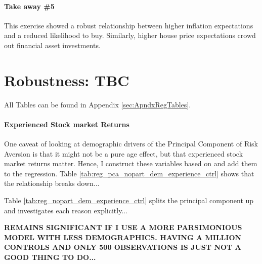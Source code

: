 \documentclass[ProjectABM]{subfiles}
\begin{document}




\paragraph{Take away \#5}
This exercise showed a robust relationship between higher inflation expectations and a reduced likelihood to buy. Similarly, higher house price expectations crowd out financial asset investments.

\section{Robustness: TBC}\label{sec:robustness}
All Tables can be found in Appendix \ref{sec:ApndxRegTables}.

\paragraph{Experienced Stock market Returns}
One caveat of looking at demographic drivers of the Principal Component of Risk Aversion is that it might not be a pure age effect, but that experienced stock market returns matter. Hence, I construct these variables based on \cite{malmendier_2011} and add them to the regression.
Table \ref{tab:reg_pca_nopart_dem_experience_ctrl} shows that the relationship breaks down...

Table \ref{tab:reg_nopart_dem_experience_ctrl} splits the principal component up and investigates each reason explicitly...

\textbf{REMAINS SIGNIFICANT IF I USE A MORE PARSIMONIOUS MODEL WITH LESS DEMOGRAPHICS. HAVING A MILLION CONTROLS AND ONLY 500 OBSERVATIONS IS JUST NOT A GOOD THING TO DO...}
\end{document}
